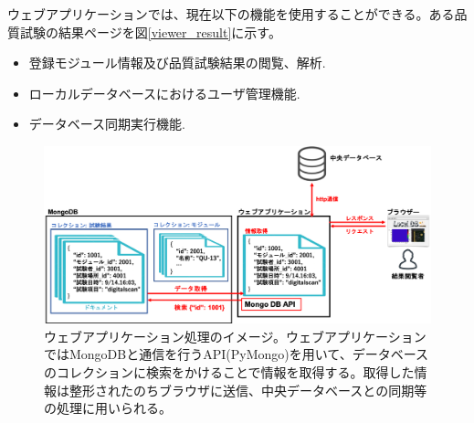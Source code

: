 ウェブアプリケーションでは、現在以下の機能を使用することができる。ある品質試験の結果ページを図\ref{viewer_result}に示す。
\begin{itemize}
  \item 登録モジュール情報及び品質試験結果の閲覧、解析.
  \item ローカルデータベースにおけるユーザ管理機能.
  \item データベース同期実行機能.
\end{itemize}

\begin{figure}[bpt]\centering
\includegraphics[width=16cm]{./webapp_process.png}
\caption[ウェブアプリケーション処理のイメージ]{ウェブアプリケーション処理のイメージ。ウェブアプリケーションではMongoDBと通信を行うAPI(PyMongo)を用いて、データベースのコレクションに検索をかけることで情報を取得する。取得した情報は整形されたのちブラウザに送信、中央データベースとの同期等の処理に用いられる。}
\label{webapp_process}
\end{figure}


